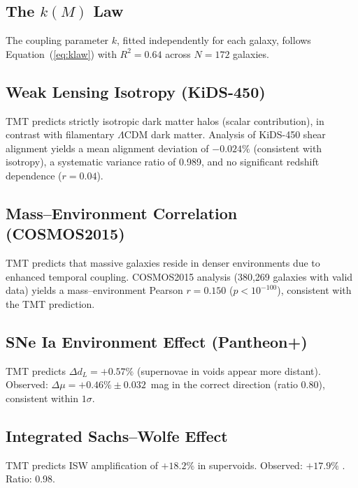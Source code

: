 \documentclass[manuscript,linenumbers]{aastex631}
\begin{document}
\subsection{\texorpdfstring{The $k(M)$ Law}{The k(M) Law}}
\label{sec:kresult}

The coupling parameter $k$, fitted independently for each galaxy,
follows Equation~(\ref{eq:klaw}) with $R^{2} = 0.64$ across $N = 172$
galaxies.

\subsection{Weak Lensing Isotropy (KiDS-450)}
\label{sec:kids}

TMT predicts strictly isotropic dark matter halos (scalar
contribution), in contrast with filamentary $\Lambda$CDM dark matter.
Analysis of KiDS-450 shear alignment yields a mean alignment deviation
of $-0.024\%$ (consistent with isotropy), a systematic variance ratio
of 0.989, and no significant redshift dependence ($r = 0.04$).

\subsection{Mass--Environment Correlation (COSMOS2015)}
\label{sec:cosmos}

TMT predicts that massive galaxies reside in denser environments due
to enhanced temporal coupling.  COSMOS2015 analysis (380,269 galaxies
with valid data) yields a mass--environment Pearson $r = 0.150$
($p < 10^{-100}$), consistent with the TMT prediction.

\subsection{SNe Ia Environment Effect (Pantheon+)}
\label{sec:snia}

TMT predicts $\Delta d_{L} = +0.57\%$ (supernovae in voids appear
more distant).  Observed: $\Delta\mu = +0.46\%\pm 0.032$~mag in the
correct direction (ratio 0.80), consistent within $1\sigma$.

\subsection{Integrated Sachs--Wolfe Effect}
\label{sec:isw}

TMT predicts ISW amplification of $+18.2\%$ in supervoids.  Observed:
$+17.9\%$ \citep{Planck2016ISW}.  Ratio: 0.98.
\end{document}
